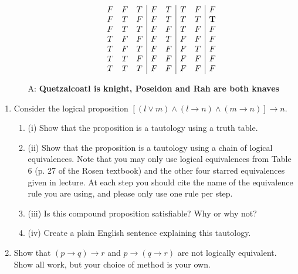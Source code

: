 \documentclass[11pt]{amsart}
\newcommand{\be}{\begin{enumerate}}
\newcommand{\ee}{\end{enumerate}}
\begin{document}
\begin{sol}
\begin{enumerate}
\begin{itemize}
\begin{displaymath}
\begin{array}{c c c|c c|c c|c}
					F & F & T & F & T & T & F & F\\
					F & T & F & F & T & T & T & \mathbf{T}\\
					F & T & T & F & F & T & F & F\\
					T & F & F & F & T & F & F & F\\
					T & F & T & F & F & F & T & F\\
					T & T & F & F & F & F & F & F\\
					T & T & T & F & F & F & F & F\\
				\end{array}
				\end{displaymath}
				\item[A:] \bfseries{Quetzalcoatl is knight, Poseidon and Rah are both knaves}\\
			\end{itemize}
		\end{enumerate}
	\end{sol}
\item 
	\be
		\item Consider the logical proposition $\left[ (l \vee  m) \wedge (l \rightarrow n) \wedge (m \rightarrow n)\right]  \rightarrow n $.
		\be
		\item[(i)] Show that the proposition is a tautology using a truth table.
		\item[(ii)] Show that the proposition is a tautology using a chain of logical equivalences. Note that you may only use logical equivalences from Table 6 (p. 27 of the Rosen textbook) and the other four starred equivalences given in lecture. At each step you should cite the name of the equivalence rule you are using, and please only use one rule per step.
		\item[(iii)] Is this compound proposition satisfiable? Why or why not?
		\item[(iv)] Create a plain English sentence explaining this tautology.
		\ee
		\item Show that $(p \rightarrow q) \rightarrow r$ and $p \rightarrow (q \rightarrow r)$ are not logically equivalent. Show all work, but your choice of method is your own.
	\ee
\end{document}
